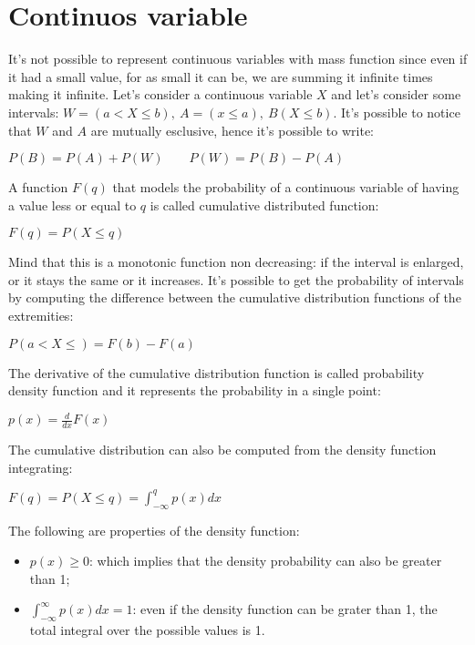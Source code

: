 \section{Continuos variable}
It's not possible to represent continuous variables with mass function since even if it had a small value, for as small it can be, we are summing it infinite times making it infinite. \newline
Let's consider a continuous variable $X$ and let's consider some intervals: $W=(a<X\leq b),~A=(x\leq a),~B(X\leq b)$. It's possible to notice that $W$ and $A$ are mutually esclusive, hence it's possible to write:
\begin{center}
	$\displaystyle P(B)=P(A)+P(W)\qquad P(W)=P(B)-P(A)$
\end{center}
\begin{definition}
A function $F(q)$ that models the probability of a continuous variable of having a value less or equal to $q$ is called cumulative distributed function:
\begin{center}
	$\displaystyle F(q)=P(X\leq q)$
\end{center}
\end{definition}
Mind that this is a monotonic function non decreasing: if the interval is enlarged, or it stays the same or it increases.\newline
It's possible to get the probability of intervals by computing the difference between the cumulative distribution functions of the extremities:
\begin{center}
	$\displaystyle P(a<X\leq)=F(b)-F(a)$
\end{center}
\begin{definition}
The derivative of the cumulative distribution function is called probability density function and it represents the probability in a single point:
\begin{center}
	$\displaystyle p(x)=\frac{d}{dx}F(x)$
\end{center}
\end{definition}
The cumulative distribution can also be computed from the density function integrating:
\begin{center}
	$\displaystyle F(q)=P(X\leq q)=\int_{-\infty}^q p(x)dx$
\end{center}
The following are properties of the density function:
\begin{itemize}
	\item $\displaystyle p(x)\geq 0$: which implies that the density probability can also be greater than 1;
	\item $\displaystyle \int_{-\infty}^\infty p(x)dx=1$: even if the density function can be grater than 1, the total integral over the possible values is 1. 
\end{itemize}
